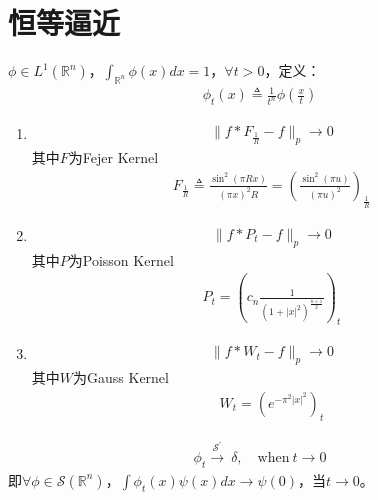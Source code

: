 \section{恒等逼近}
$\phi\in L^1(\mathbb{R}^n)$，$\int_{\mathbb{R}^n} \phi(x) dx = 1$，$\forall t > 0$，定义：
\begin{align*}
    \phi_t(x) \triangleq \frac{1}{t^n} \phi\left(\frac{x}{t}\right)
\end{align*}

\begin{Corollary}
    \begin{enumerate}[leftmargin=1cm, label=\arabic*.]
        \item 
        \begin{align*}
            \|f * F_{\frac{1}{R}} - f\|_p \to 0
        \end{align*}
        其中$F$为Fejer Kernel
        \begin{align*}
            F_{\frac{1}{R}} \triangleq \frac{\sin^2(\pi R x)}{(\pi x)^2 R} = \left(\frac{\sin^2(\pi u)}{(\pi u)^2}\right)_{\frac{1}{R}}
        \end{align*}

        \item 
        \begin{align*}
            \|f * P_t - f\|_p \to 0
        \end{align*}
        其中$P$为Poisson Kernel
        \begin{align*}
            P_t = \left( c_n \frac{1}{(1 + |x|^2)^{\frac{n+1}{2}}} \right)_t
        \end{align*}

        \item 
        \begin{align*}
            \|f*W_t - f\|_p \to 0
        \end{align*}
        其中$W$为Gauss Kernel
        \begin{align*}
            W_t = \left(e^{-\pi^2 |x|^2} \right)_t
        \end{align*}
    \end{enumerate}
\end{Corollary}

\begin{Corollary}
    \begin{align*}
        \phi_t \xrightarrow{\mathcal{S}^{\prime}}\ \delta,\quad \text{when}\ t\to 0
    \end{align*}
    即$\forall \phi\in \mathcal{S}(\mathbb{R}^n)$，$\int \phi_t(x) \psi(x) dx \to \psi(0)$，当$t\to 0$。
\end{Corollary}
    
